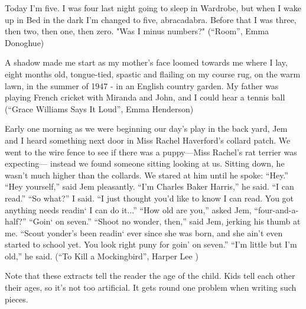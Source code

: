 \documentclass[11pt]{article}
\newenvironment{narrow}[2]{%
 \begin{list}{}{%
  \setlength{\topsep}{0pt}%
  \setlength{\leftmargin}{#1}%
  \setlength{\rightmargin}{#2}%
  \setlength{\listparindent}{\parindent}%
  \setlength{\itemindent}{\parindent}%
  \setlength{\parsep}{\parskip}%
 }%
\item[]}{\end{list}}
\begin{document}
\begin{itemize}
\item 
\begin{narrow}{1.0cm}{1.0cm}
Today I'm five. I was four last night going to sleep in Wardrobe, but when I 
wake up in Bed in the dark I'm changed to five, abracadabra. Before that I was 
three, then two, then one, then zero.
"Was I minus numbers?" (``Room'', Emma Donoghue)
\end{narrow}


\item 
\begin{narrow}{1.0cm}{1.0cm}
A shadow made me start as my mother's face loomed towards me where I lay, eight months old, tongue-tied, spastic and flailing on my course rug, on the warm lawn, in the summer of 1947 - in an English country garden. My father was playing French cricket with Miranda and John, and I could hear a tennis ball (``Grace Williams Says It Loud'', Emma Henderson)

\end{narrow}




\item 
\begin{narrow}{1.0cm}{1.0cm}
Early one morning as we were beginning our day’s play in the back yard, Jem and I
heard something next door in Miss Rachel Haverford’s collard patch. We went to the
wire fence to see if there was a puppy—Miss Rachel’s rat terrier was expecting—
instead we found someone sitting looking at us. Sitting down, he wasn’t much higher
than the collards. We stared at him until he spoke:
“Hey.”
“Hey yourself,” said Jem pleasantly.
“I’m Charles Baker Harris,” he said. “I can read.”
“So what?” I said.
“I just thought you’d like to know I can read. You got anything needs readin‘ I can do
it...”
“How old are you,” asked Jem, “four-and-a-half?”
“Goin‘ on seven.”
“Shoot no wonder, then,” said Jem, jerking his thumb at me. “Scout yonder’s been
readin‘ ever since she was born, and she ain’t even started to school yet. You look right
puny for goin’ on seven.”
“I’m little but I’m old,” he said. (``To Kill a Mockingbird'', Harper Lee )

\end{narrow}

\end{itemize}

Note that these extracts tell the reader the age of the child. Kids tell each other their ages, so it's not too artificial. It gets round one problem when writing such pieces.
\end{document}

